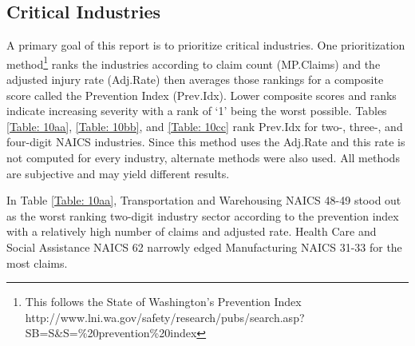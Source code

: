 \documentclass[9pt, oneside]{article}   	%
\begin{document}
\subsection{Critical Industries}
A primary goal of this report is to prioritize critical industries. One prioritization method\footnote{This follows the State of Washington's Prevention Index\\
http://www.lni.wa.gov/safety/research/pubs/search.asp?SB=S\&S=\%20prevention\%20index} ranks the industries according to claim count (MP.Claims) and the adjusted injury rate (Adj.Rate) then averages those rankings for a composite score called the Prevention Index (Prev.Idx). Lower composite scores and ranks indicate increasing severity with a rank of `1' being the worst possible. Tables \ref{Table: 10aa}, \ref{Table: 10bb}, and \ref{Table: 10cc} rank Prev.Idx for two-, three-, and four-digit NAICS industries.  Since this method uses the Adj.Rate and this rate is not computed for every industry, alternate methods were also used. All methods are subjective and may yield different results.

In Table \ref{Table: 10aa}, Transportation and Warehousing NAICS 48-49 stood out as the worst ranking two-digit industry sector according to the prevention index with a relatively high number of claims and adjusted rate. Health Care and Social Assistance NAICS 62 narrowly edged Manufacturing NAICS 31-33 for the most claims.
\end{document}
